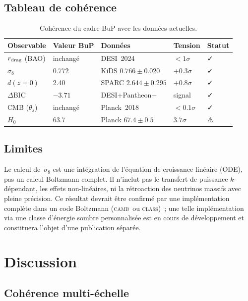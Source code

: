 \documentclass[a4paper,11pt]{article}
\newcommand{\rdrag}{r_{\rm drag}}
\newcommand{\sig}{\sigma_8}
\newcommand{\camb}{\textsc{camb}}
\begin{document}
\subsection{Tableau de cohérence}

\begin{table}[htbp]
\centering
\caption{Cohérence du cadre BuP avec les données actuelles.}
\label{tab:coherence}
\smallskip
\begin{tabular}{lllll}
\toprule
Observable & Valeur BuP & Données & Tension & Statut \\
\midrule
$\rdrag$ (BAO) & inchangé & DESI~2024 & $<1\sigma$ & ✓ \\
$\sig$ & 0.772 & KiDS $0.766\pm 0.020$ & $+0.3\sigma$ & ✓ \\
$d(z{=}0)$ & 2.40 & SPARC $2.644\pm 0.295$ & $+0.8\sigma$ & ✓ \\
$\Delta$BIC & $-3.71$ & DESI+Pantheon+ & signal & ✓ \\
CMB ($\theta_s$) & inchangé & Planck~2018 & $<0.1\sigma$ & ✓ \\
$H_0$ & 63.7 & Planck $67.4\pm 0.5$ & $3.7\sigma$ & ⚠ \\
\bottomrule
\end{tabular}
\end{table}

\subsection{Limites}

Le calcul de~$\sig$ est une intégration de l'équation de croissance
linéaire (ODE), pas un calcul Boltzmann complet. Il n'inclut pas le
transfert de puissance $k$-dépendant, les effets non-linéaires, ni la
rétroaction des neutrinos massifs avec pleine précision. Ce résultat
devrait être confirmé par une implémentation complète dans un code Boltzmann
(\camb\ ou \textsc{class})~; une telle implémentation via une classe
d'énergie sombre personnalisée est en cours de développement et constituera
l'objet d'une publication séparée.

\section{Discussion}
\label{sec:discussion}

\subsection{Cohérence multi-échelle}
\end{document}
